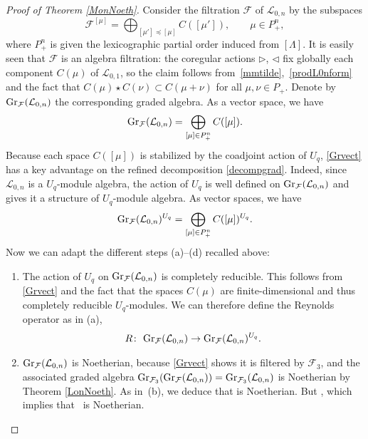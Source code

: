 \documentclass[10pt,a4paper]{amsart}
\numberwithin{equation}{section}
\theoremstyle{definition}
\newcommand{\Ff}{{\mathcal F}}
\newcommand{\Ll}{{\mathcal L}}
\newcommand{\ra}{\rightarrow}
\begin{document}
\begin{proof}[Proof of Theorem \ref{MonNoeth}] Consider the filtration $\Ff$ of ${\mathcal L}_{0,n}$ by the subspaces
\[{\mathcal F}^{[\mu]} =\bigoplus_{[\mu']\preceq [\mu]} C([\mu']), \qquad \mu\in P_+^n,\]
where $P_+^n$ is given the lexicographic partial order induced from $[\Lambda]$. It is easily seen that $\mathcal{F}$ is an algebra filtration: the coregular actions $\rhd$, $\lhd$ fix globally each component $C(\mu)$ of $\Ll_{0,1}$, so the claim follows from~\eqref{mmtilde},~\eqref{prodL0nform} and the fact that $C(\mu)\star C(\nu) \subset C(\mu+\nu)$ for all $\mu,\nu\in P_+$. Denote by ${\rm Gr}_{\mathcal F}({\mathcal L}_{0,n})$ the corresponding graded algebra. As a vector space, we have
\begin{equation}\label{Grvect}
{\rm Gr}_{{\mathcal F}}({\mathcal L}_{0,n})= \bigoplus_{[\mu]\in P_+^n} C([\mu]).
\end{equation}
Because each space $C([\mu])$ is stabilized by the coadjoint action of $U_q$, \eqref{Grvect} has a key advantage on the refined decomposition \eqref{decompgrad}. Indeed, since ${\mathcal L}_{0,n}$ is a $U_q$-module algebra, the action of $U_q$ is well defined on ${\rm Gr}_{\mathcal F}({\mathcal L}_{0,n})$ and gives it a structure of $U_q$-module algebra. As vector spaces, we have
\[%
{\rm Gr}_{{\mathcal F}}({\mathcal L}_{0,n})^{U_q}=\bigoplus_{[\mu]\in P_+^n} C([\mu])^{U_q}.%
\]
Now we can adapt the different steps (a)--(d) recalled above:
\begin{enumerate}\itemsep=0pt %
\item[(a$'$)] The action of $U_q$ on ${\rm Gr}_{\mathcal F}({\mathcal L}_{0,n})$ is completely reducible. This follows from \eqref{Grvect} and the fact that the spaces $C(\mu)$ are finite-dimensional and thus completely reducible $U_q$-modules. We can therefore define the Reynolds operator as in (a),
\[R\colon\ {\rm Gr}_{{\mathcal F}}({\mathcal L}_{0,n})\ra {\rm Gr}_{{\mathcal F}}({\mathcal L}_{0,n})^{U_q}.\]
\item[(b$'$)] ${\rm Gr}_{{\mathcal F}}({\mathcal L}_{0,n})$ is Noetherian, because \eqref{Grvect} shows it is filtered by ${\mathcal F}_3$, and the associated graded algebra ${\rm Gr}_{{\mathcal F}_3}({\rm Gr}_{{\mathcal F}}({\mathcal L}_{0,n}))={\rm Gr}_{{\mathcal F}_3}({\mathcal L}_{0,n})$ is Noetherian by Theorem \ref{LonNoeth}. As in~(b), we deduce that  is Noetherian. But , which implies that~ is Noetherian.

\end{enumerate}
\end{proof}
\end{document}
